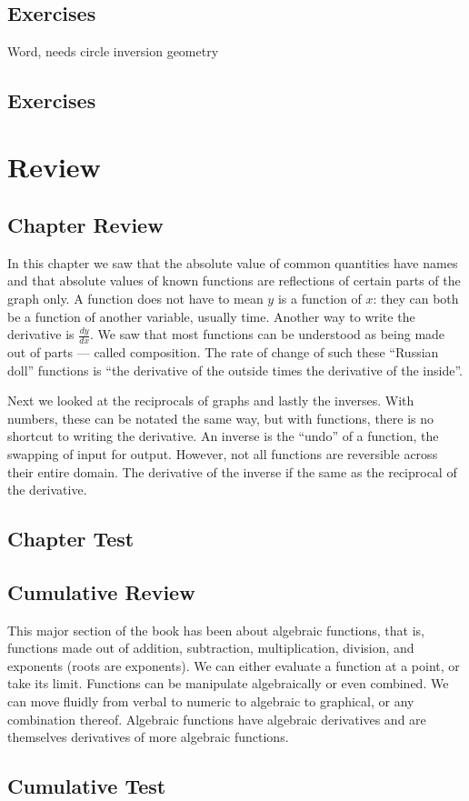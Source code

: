\newpage
{}
\newpage

~\vfill
\newpage
\subsection{Exercises}
Word, needs circle inversion geometry
~\vfill


{}
\noindent{}

\newpage
\subsection{Exercises}
\noindent{}




\newpage
\section{Review}
\subsection{Chapter Review}
In this chapter we saw that the absolute value of common quantities have names and that absolute
values of known functions are reflections of certain parts of the graph only.  
A function does not have to mean $y$ is a function of $x$: they can both be a function of
another variable, usually time.  Another way to write the derivative is $\frac{dy}{dx}$.
We saw that most functions can be understood as being
made out of parts --- called composition.  The rate of change of such these ``Russian doll''
functions is ``the derivative of the outside times the derivative of the inside''.

Next we looked at the reciprocals of graphs and lastly the inverses.  With numbers, these can
be notated the same way, but with functions, there is no shortcut to writing the derivative.
An inverse is the ``undo'' of a function, the swapping of input for output.  However, not all 
functions are reversible across their entire domain.  The derivative of the inverse if the same
as the reciprocal of the derivative.

\subsection{Chapter Test}
\subsection{Cumulative Review} 
This major section of the book has been about algebraic functions, that is, functions made out
of addition, subtraction, multiplication, division, and exponents (roots are exponents).  We 
can either evaluate a function at a point, or take its limit.  Functions can be manipulate
algebraically or even combined.  We can move fluidly from verbal to numeric to algebraic to
graphical, or any combination thereof.  Algebraic functions have algebraic derivatives and are
themselves derivatives of more algebraic functions.
\subsection{Cumulative Test}
